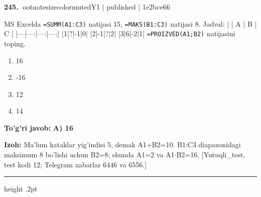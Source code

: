 \documentclass[10pt,a4paper]{article}
\begin{document}
\textbf{\color{ink}245.} {ootnotesizecolor{muted}Y1 | published | 1e2bce66}
\par
MS Excelda \texttt{=SUMM(A1:C3)} natijasi 15, \texttt{=MAKS(B1:C3)} natijasi 8. Jadval: \newline  \newline |   | A | B | C | \newline |---|---:|---:|---:| \newline |1|?|-1|0| \newline |2|-1|?|2| \newline |3|6|-2|1| \newline  \newline \texttt{=PROIZVED(A1;B2)} natijasini toping.
\begin{enumerate}[label=\Alph*),leftmargin=9mm]
\item 16
\item -16
\item 12
\item 14
\end{enumerate}
\begin{tcolorbox}[enhanced,breakable,colback=teal!4,colframe=teal!55!black,boxrule=0.45pt,arc=1.2mm,left=2.8mm,right=2.8mm,top=2mm,bottom=2mm]
\textbf{\color{teal}To'g'ri javob:} \textbf{A) 16}
\par\smallskip
\textbf{Izoh:} Ma'lum kataklar yig'indisi 5, demak A1+B2=10. B1:C3 diapazonidagi maksimum 8 bo'lishi uchun B2=8; shunda A1=2 va A1\ensuremath{\cdot}B2=16. [Yutuqli\_test, test kodi 12; Telegram xabarlar 6446 va 6556.]
\end{tcolorbox}
\vspace{2mm}\hrule height .2pt\vspace{2mm}
\end{document}
